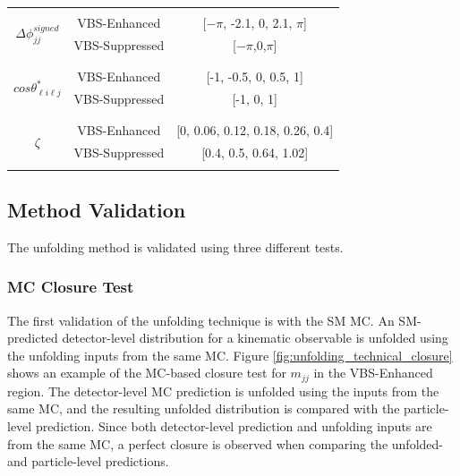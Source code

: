 \begin{table}
\begin{center}
\begin{tabular}{ | c | c | c | }
    & &\\
    \hline
    \multirow{4}{*}{ $\Delta \phi_{jj}^{signed}$ } &  &  \\
    & VBS-Enhanced & [$-\pi$, -2.1, 0, 2.1, $\pi$] \\
    & VBS-Suppressed & [$-\pi$,0,$\pi$] \\
    & & \\
    \hline
    \multirow{4}{*}{ $cos \theta_{\ell i\ell j}^{\ast}$ } &  &  \\
    & VBS-Enhanced & [-1, -0.5, 0, 0.5, 1] \\
    & VBS-Suppressed & [-1, 0, 1]\\
    & & \\
    \hline
    \multirow{4}{*}{ $\zeta$ } &  &  \\
    & VBS-Enhanced &[0, 0.06, 0.12, 0.18, 0.26, 0.4] \\
    & VBS-Suppressed & [0.4, 0.5, 0.64, 1.02]\\
    & &\\
    \hline
    \end{tabular}
    \end{center}
\end{table}

\subsection{Method Validation}
\label{subsec:UnfoldingValidation}
The unfolding method is validated using three different tests.

\subsubsection{MC Closure Test}
\label{subsubsec:MCClosure}

The first validation of the unfolding technique is with the SM MC. An SM-predicted detector-level distribution for a kinematic observable is unfolded using the unfolding inputs from the same MC. Figure \ref{fig:unfolding_technical_closure} shows an example of the MC-based closure test for $m_{jj}$ in the VBS-Enhanced region. The detector-level MC prediction is unfolded using the inputs from the same MC, and the resulting unfolded distribution is compared with the particle-level prediction. Since both detector-level prediction and unfolding inputs are from the same MC, a perfect closure is observed when comparing the unfolded- and particle-level predictions.

